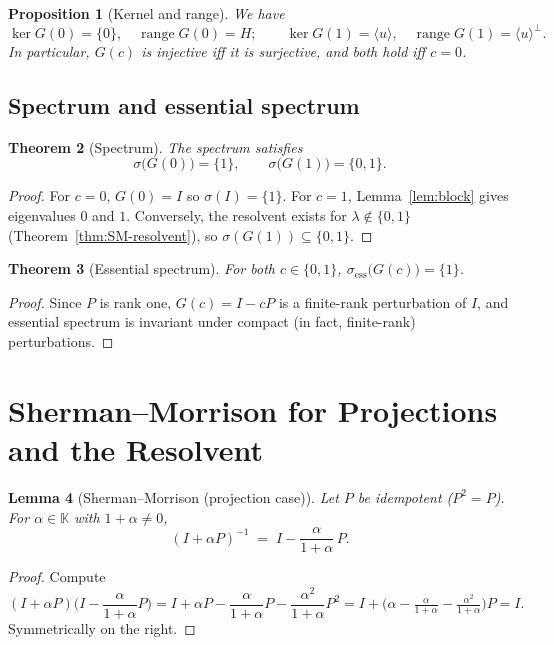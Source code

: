 \documentclass[11pt]{article}
\newtheorem{theorem}{Theorem}[section]
\newtheorem{proposition}[theorem]{Proposition}
\newtheorem{lemma}[theorem]{Lemma}
\theoremstyle{definition}
\newcommand{\K}{\mathbb{K}}
\DeclareMathOperator{\range}{range}
\DeclareMathOperator{\kerop}{ker}
\begin{document}
\begin{proposition}[Kernel and range]\label{prop:ker-range}
We have
\[
\kerop G(0)=\{0\},\quad \range G(0)=H;\qquad
\kerop G(1)=\langle u\rangle,\quad \range G(1)=\langle u\rangle^\perp.
\]
In particular, $G(c)$ is injective iff it is surjective, and both hold iff $c=0$.
\end{proposition}

\subsection{Spectrum and essential spectrum}

\begin{theorem}[Spectrum]\label{thm:spectrum}
The spectrum satisfies
\[
\sigma\big(G(0)\big)=\{1\},\qquad \sigma\big(G(1)\big)=\{0,1\}.
\]
\end{theorem}

\begin{proof}
For $c=0$, $G(0)=I$ so $\sigma(I)=\{1\}$. For $c=1$, Lemma~\ref{lem:block} gives eigenvalues $0$ and $1$. Conversely, the resolvent exists for $\lambda\notin\{0,1\}$ (Theorem~\ref{thm:SM-resolvent}), so $\sigma(G(1))\subseteq\{0,1\}$.
\end{proof}

\begin{theorem}[Essential spectrum]\label{thm:ess}
For both $c\in\{0,1\}$, $\sigma_{\mathrm{ess}}\big(G(c)\big)=\{1\}$.
\end{theorem}

\begin{proof}
Since $P$ is rank one, $G(c)=I-cP$ is a finite-rank perturbation of $I$, and essential spectrum is invariant under compact (in fact, finite-rank) perturbations.
\end{proof}

\section{Sherman--Morrison for Projections and the Resolvent}\label{sec:SM}

\begin{lemma}[Sherman--Morrison (projection case)]\label{lem:SM}
Let $P$ be idempotent ($P^2=P$). For $\alpha\in\K$ with $1+\alpha\neq 0$,
\[
(I+\alpha P)^{-1} \;=\; I - \frac{\alpha}{1+\alpha}\,P.
\]
\end{lemma}

\begin{proof}
Compute
\[
(I+\alpha P)\Big(I - \frac{\alpha}{1+\alpha}P\Big)
= I + \alpha P - \frac{\alpha}{1+\alpha}P - \frac{\alpha^2}{1+\alpha}P^2
= I + \Big(\alpha - \tfrac{\alpha}{1+\alpha} - \tfrac{\alpha^2}{1+\alpha}\Big)P = I.
\]
Symmetrically on the right.
\end{proof}
\end{document}
